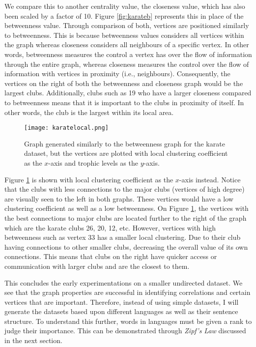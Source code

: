 We compare this to another centrality value, the closeness value, which has also been scaled by a factor of 10. Figure \ref{fig:karateb} represents this in place of the betweenness value. Through comparison of both, vertices are positioned similarly to betweenness. This is because betweenness values considers all vertices within the graph whereas closeness considers all neighbours of a specific vertex. In other words, betweenness measures the control a vertex has over the flow of information through the entire graph, whereas closeness measures the control over the flow of information with vertices in proximity (i.e., neighbours). Consequently, the vertices on the right of both the betweenness and closeness graph would be the largest clubs. Additionally, clubs such as 19 who have a larger closeness compared to betweenness means that it is important to the clubs in proximity of itself. In other words, the club is the largest within its local area.

\begin{figure}[!htb]
	\centering
	\texttt{[image: karatelocal.png]}
	\caption{Graph generated similarly to the betweenness graph for the karate dataset, but the vertices are plotted with local clustering coefficient as the $x$-axis and trophic levels as the $y$-axis.}
	\label{fig:karatelocal}
\end{figure}

Figure \ref{fig:karatelocal} is shown with local clustering coefficient as the $x$-axis instead. Notice that the clubs with less connections to the major clubs (vertices of high degree) are visually seen to the left in both graphs. These vertices would have a low clustering coefficient as well as a low betweenness. On Figure \ref{fig:karatelocal}, the vertices with the best connections to major clubs are located further to the right of the graph which are the karate clubs 26, 20, 12, etc. However, vertices with high betweenness such as vertex 33 has a smaller local clustering. Due to their club having connections to other smaller clubs, decreasing the overall value of its own connections. This means that clubs on the right have quicker access or communication with larger clubs and are the closest to them.

This concludes the early experimentations on a smaller undirected dataset. We see that the graph properties are successful in identifying correlations and certain vertices that are important. Therefore, instead of using simple datasets, I will generate the datasets based upon different languages as well as their sentence structure. To understand this further, words in languages must be given a rank to judge their importance. This can be demonstrated through \emph{Zipf's Law} discussed in the next section.

